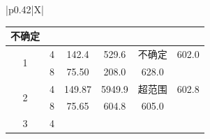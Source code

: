 \documentclass[UTF8,10pt,a4paper,fontset=fandol]{ctexart}
\newcommand{\fieldvalue}[1]{#1}
\newcommand{\handwritten}[1]{#1}
\begin{document}
\begin{center}
\begin{center}
\begin{tabularx}{\textwidth}{|p{}|X|}
{\begin{tabular}{|c|c|c|c|c|c|}
\fieldvalue{\handwritten{不确定}}
&\\
\hline
\multirow{2}{*}{1}
&
\fieldvalue{\handwritten{4}}
&
\fieldvalue{\handwritten{142.4}}
&
\fieldvalue{\handwritten{529.6}}
&
\fieldvalue{\handwritten{不确定}}
&
\fieldvalue{\handwritten{602.0}}\\
\cline{2-6}
&
\fieldvalue{\handwritten{8}}
&
\fieldvalue{\handwritten{75.50}}
&
\fieldvalue{\handwritten{208.0}}
&
\fieldvalue{\handwritten{628.0}}
&\\
\hline
\multirow{2}{*}{2}
&
\fieldvalue{\handwritten{4}}
&
\fieldvalue{\handwritten{149.87}}
&
\fieldvalue{\handwritten{5949.9}}
&
\fieldvalue{\handwritten{超范围}}
&
\fieldvalue{\handwritten{602.8}}\\
\cline{2-6}
&
\fieldvalue{\handwritten{8}}
&
\fieldvalue{\handwritten{75.65}}
&
\fieldvalue{\handwritten{604.8}}
&
\fieldvalue{\handwritten{605.0}}
&\\
\hline
\multirow{2}{*}{3}
&
\fieldvalue{\handwritten{4}}
&

\end{tabular}}
\end{tabularx}
\end{center}
\end{center}
\end{document}
